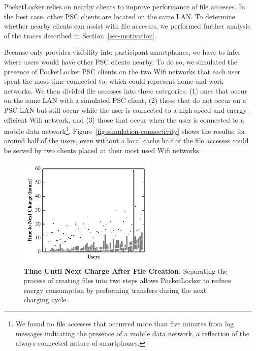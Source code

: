 PocketLocker relies on nearby clients to improve performance of file
accesses. In the best case, other PSC clients are located on the same LAN. To
determine whether nearby clients can assist with file accesses, we performed further
analysis of the traces described in Section~\ref{sec-motivation}.

Because \PhoneLab{} only provides visibility into participant smartphones, we
have to infer where users would have other PSC clients nearby. To do so, we
simulated the presence of PocketLocker PSC clients on the two Wifi networks
that each user spent the most time connected to, which could represent home
and work networks. We then divided file accesses into three categories: (1)
ones that occur on the same LAN with a simulated PSC client, (2) those that
do not occur on a PSC LAN but still occur while the user is connected to a
high-speed and energy-efficient Wifi network, and (3) those that occur when
the user is connected to a mobile data network\footnote{We found no file
  accesses that occurred more than five minutes from log messages indicating
  the presence of a mobile data network, a reflection of the always-connected
nature of smartphones.}. Figure~\ref{fig-simulation-connectivity} shows the
results; for around half of the users, even without a local cache half of the
file accesses could be served by two clients placed at their most
used Wifi networks. 

\begin{figure}

  \vspace*{-0.3in}

  \includegraphics[width=0.6\textwidth]{./figures/pocketlocker/BatteryLengthDistributionGraph.pdf}
  
  \vspace*{-0.1in}

  \caption{\small \textbf{Time Until Next Charge After File Creation.}
    Separating the process of creating files into two steps allows
  PocketLocker to reduce energy consumption by performing transfers during
the next charging cycle.}
  
  \vspace*{-0.2in}

  \label{fig-simulation-battery}

\end{figure}


